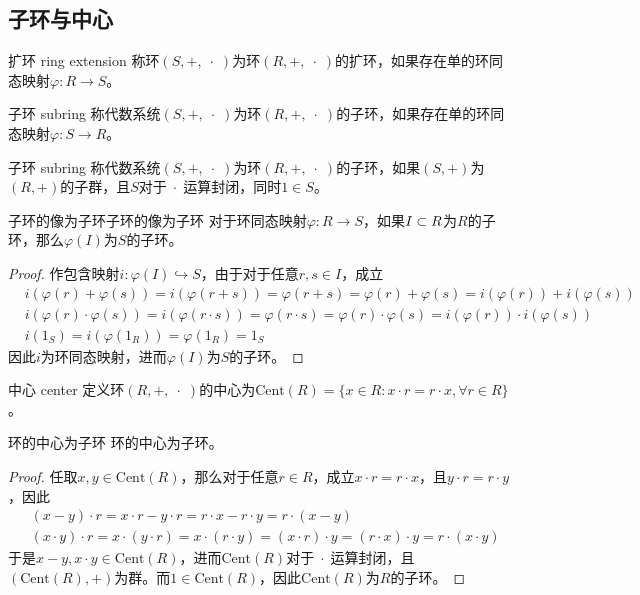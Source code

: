 \subsection{子环与中心}

\begin{definition}{扩环 ring extension}
	称环$(S,+,\;\cdot\;)$为环$(R,+,\;\cdot\;)$的扩环，如果存在单的环同态映射$\varphi:R\to S$。
\end{definition}

\begin{definition}{子环 subring}
	称代数系统$(S,+,\;\cdot\;)$为环$(R,+,\;\cdot\;)$的子环，如果存在单的环同态映射$\varphi:S\to R$。
\end{definition}

\begin{definition}{子环 subring}
	称代数系统$(S,+,\;\cdot\;)$为环$(R,+,\;\cdot\;)$的子环，如果$(S,+)$为$(R,+)$的子群，且$S$对于$\;\cdot\;$运算封闭，同时$1\in S$。
\end{definition}

\begin{proposition}{子环的像为子环}{子环的像为子环}
	对于环同态映射$\varphi:R\to S$，如果$I\subset R$为$R$的子环，那么$\varphi(I)$为$S$的子环。
\end{proposition}

\begin{proof}
	作包含映射$i:\varphi(I)\hookrightarrow S$，由于对于任意$r,s\in I$，成立
	\begin{align*}
		&i(\varphi(r)+\varphi(s))=i(\varphi(r+s))=\varphi(r+s)=\varphi(r)+\varphi(s)=i(\varphi(r))+i(\varphi(s))\\
		&i(\varphi(r)\cdot\varphi(s))=i(\varphi(r\cdot s))=\varphi(r\cdot s)=\varphi(r)\cdot \varphi(s)=i(\varphi(r))\cdot i(\varphi(s))\\
		&i(1_S)=i(\varphi(1_R))=\varphi(1_R)=1_S
	\end{align*}
	因此$i$为环同态映射，进而$\varphi(I)$为$S$的子环。
\end{proof}

\begin{definition}{中心 center}
	定义环$(R,+,\;\cdot\;)$的中心为$\mathrm{Cent}(R)=\{ x\in R:x\cdot r=r\cdot x,\forall r\in R \}$。
\end{definition}

\begin{proposition}{}{环的中心为子环}
	环的中心为子环。
\end{proposition}

\begin{proof}
	任取$x,y\in\mathrm{Cent}(R)$，那么对于任意$r\in R$，成立$x\cdot r=r\cdot x$，且$y\cdot r=r\cdot y$，因此
	\begin{align*}
		&(x-y)\cdot r=x\cdot r-y\cdot r=r\cdot x-r\cdot y=r\cdot (x-y)\\
		&(x\cdot y)\cdot r=x\cdot (y\cdot r)=x\cdot (r\cdot y)=(x\cdot r)\cdot y=(r\cdot x)\cdot y=r\cdot (x\cdot y)
	\end{align*}
	于是$x-y,x\cdot y\in\mathrm{Cent}(R)$，进而$\mathrm{Cent}(R)$对于$\;\cdot\;$运算封闭，且$(\mathrm{Cent}(R),+)$为群。而$1\in \mathrm{Cent}(R)$，因此$\mathrm{Cent}(R)$为$R$的子环。
\end{proof}

